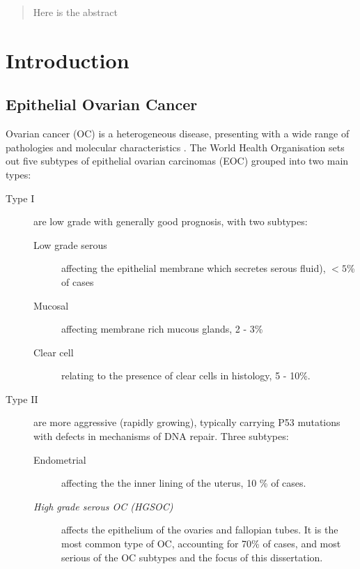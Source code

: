 \documentclass[draft, tikz, 12pt,a4paper,oneside,fleqn]{article}
\begin{document}
\newpage
\setcounter{page}{1}

\tableofcontents

\newpage


\begin{abstract}
Here is the abstract
\end{abstract}
\newpage


\section{Introduction}

\subsection{Epithelial Ovarian Cancer}
\label{sec-epithelial-ovarian-cancer}

Ovarian cancer (OC) is a heterogeneous disease, presenting with a wide range of pathologies and molecular characteristics .  The World Health Organisation sets out five subtypes of epithelial ovarian carcinomas (EOC) grouped into two main types\cite{Kossai2018, Lisio2019}: 

\begin{description}
\item[Type I] are low grade with generally good prognosis, with two subtypes:
\begin{description}
\item[Low grade serous] affecting the epithelial membrane which secretes serous fluid), $< 5$\% of cases
\item[Mucosal] affecting membrane rich mucous glands, 2 - 3\% 
\item[Clear cell] relating to the presence of clear cells in histology, 5 - 10\%.
\end{description}
\item[Type II] are more aggressive (rapidly growing), typically carrying P53 mutations with defects in mechanisms of DNA repair. Three subtypes:
\begin{description}
\item[Endometrial] affecting the the inner lining of the uterus, 10 \% of cases.
\item[\emph{High grade serous OC (HGSOC)}] affects the epithelium of the ovaries and fallopian tubes.  It is the most common type of OC, accounting for 70\% of cases, and most serious of the OC subtypes and the focus of this dissertation.
\end{description}
\end{description}
\end{document}
